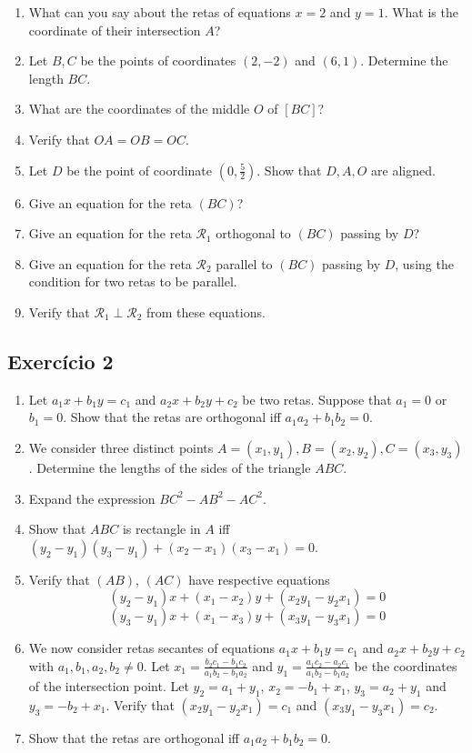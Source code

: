 \begin{enumerate}
\item What can you say about the retas of equations $x=2$ and $y=1$.
  What is the coordinate of their intersection $A$?
\item Let $B,C$ be the points of coordinates $(2,-2)$ and $(6,1)$.
  Determine the length $BC$.
\item What are the coordinates of the middle $O$ of $[BC]$?
\item Verify that $OA=OB=OC$.
\item Let $D$ be the point of coordinate $\left(0,\frac{5}{2}\right)$.
  Show that $D,A,O$ are aligned.
\item Give an equation for the reta $(BC)$?
\item Give an equation for the reta ${\mathcal R}_1$
  orthogonal to $(BC)$ passing by $D$?
\item Give an equation for the reta ${\mathcal R}_2$ parallel to
  $(BC)$ passing by $D$, using the condition for two retas to be parallel.
\item Verify that ${\mathcal R}_1 \perp {\mathcal R}_2$ from these equations.
\end{enumerate}

\subsection*{Exercício 2}

\begin{enumerate}
\item Let $a_1x+b_1y=c_1$ and $a_2x+b_2y+c_2$ be two retas.
  Suppose that $a_1=0$ or $b_1=0$.
  Show that the retas are orthogonal iff $a_1a_2+b_1b_2=0$.
\item We consider three distinct points
  $A={(x_1,y_1)}, B={(x_2,y_2)}, C={(x_3,y_3)}$.
  Determine the lengths of the sides of the triangle $ABC$.
\item Expand the expression ${BC}^2 - {AB}^2 - {AC}^2$.
\item Show that $ABC$ is rectangle in $A$
  iff ${(y_2-y_1)}{(y_3-y_1)}+{(x_2-x_1)}{(x_3-x_1)} = 0$.
\item Verify that $(AB)$, $(AC)$ have respective equations
  $${(y_2 - y_1)} x + {(x_1 - x_2)} y + {(x_2y_1 - y_2x_1)} = 0$$
  $${(y_3 - y_1)} x + {(x_1 - x_3)} y + {(x_3y_1 - y_3x_1)} = 0$$
\item We now consider retas secantes of equations
  $a_1x+b_1y=c_1$ and $a_2x+b_2y+c_2$ with $a_1,b_1,a_2,b_2 \neq 0$.
  Let $x_1 = \frac{b_2c_1-b_1c_2}{a_1b_2 - b_1a_2}$ and
  $y_1 = \frac{a_1c_2-a_2c_1}{a_1b_2 - b_1a_2}$
  be the coordinates of the intersection point.
  Let $y_2=a_1+y_1$, $x_2=-b_1+x_1$, $y_3=a_2+y_1$
  and $y_3=-b_2+x_1$. Verify that ${(x_2y_1 - y_2x_1)} = c_1$ and
  ${(x_3y_1 - y_3x_1)} = c_2$.
\item Show that the retas are orthogonal iff
  $a_1a_2+b_1b_2=0$.
\end{enumerate}

